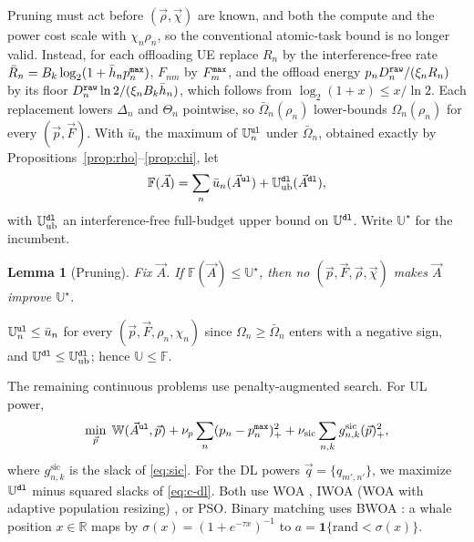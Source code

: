 \documentclass[journal]{IEEEtran}
\newtheorem{lemma}{Lemma}
\begin{document}
Pruning must act before $(\vec{\rho},\vec{\chi})$ are known, and both the compute and the power cost scale with $\chi_n\rho_n$, so the conventional atomic-task bound is no longer valid. Instead, for each offloading UE replace $R_n$ by the interference-free rate $\bar R_n=B_k\log_2(1+\bar h_np_n^{\tt max})$, $F_{nm}$ by $F_m^{\tt max}$, and the offload energy $p_nD_n^{\tt raw}/(\xi_nR_n)$ by its floor $D_n^{\tt raw}\ln2/(\xi_nB_k\bar h_n)$, which follows from $\log_2(1+x)\le x/\ln2$. Each replacement lowers $\Delta_n$ and $\Theta_n$ pointwise, so $\bar\Omega_n(\rho_n)$ lower-bounds $\Omega_n(\rho_n)$ for every $(\vec{p},\vec{F})$. With $\bar u_n$ the maximum of $\mathbb{U}_n^{\tt ul}$ under $\bar\Omega_n$, obtained exactly by Propositions~\ref{prop:rho}--\ref{prop:chi}, let
\begin{equation}
\mathbb{F}(\vec{A})=\sum_{n}\bar u_n(\vec{A}^{\tt ul})+\mathbb{U}^{\tt dl}_{\mathrm{ub}}(\vec{A}^{\tt dl}),
\label{eq:Fbound}
\end{equation}
with $\mathbb{U}^{\tt dl}_{\mathrm{ub}}$ an interference-free full-budget upper bound on $\mathbb{U}^{\tt dl}$. Write $\mathbb{U}^\star$ for the incumbent.

\begin{lemma}[Pruning]\label{lem:prune}
Fix $\vec{A}$. If $\mathbb{F}(\vec{A})\le\mathbb{U}^\star$, then no $(\vec{p},\vec{F},\vec{\rho},\vec{\chi})$ makes $\vec{A}$ improve $\mathbb{U}^\star$.
\end{lemma}
\begin{IEEEproof}
$\mathbb{U}_n^{\tt ul}\le\bar u_n$ for every $(\vec{p},\vec{F},\rho_n,\chi_n)$ since $\Omega_n\ge\bar\Omega_n$ enters with a negative sign, and $\mathbb{U}^{\tt dl}\le\mathbb{U}^{\tt dl}_{\mathrm{ub}}$; hence $\mathbb{U}\le\mathbb{F}$.
\end{IEEEproof}

The remaining continuous problems use penalty-augmented search. For UL power,
\begin{equation}
\min_{\vec{p}}\;
\mathbb{W}(\vec{A}^{\tt ul},\vec{p})
+\nu_p\sum_n(p_n-p_n^{\tt max})_+^2
+\nu_{\mathrm{sic}}\sum_{n,k}g_{n,k}^{\mathrm{sic}}(\vec{p})_+^2,
\label{eq:mpc}
\end{equation}
where $g_{n,k}^{\mathrm{sic}}$ is the slack of \eqref{eq:sic}. For the DL powers $\vec{q}=\{q_{m',n'}\}$, we maximize $\mathbb{U}^{\tt dl}$ minus squared slacks of \eqref{eq:c-dl}. Both use WOA \cite{mirjalili2016whale}, IWOA (WOA with adaptive population resizing) \cite{Hoang_TCOM_2024}, or PSO. Binary matching uses BWOA \cite{kumar2020binary}: a whale position $x\in\mathbb{R}$ maps by $\sigma(x)=(1+e^{-\tau x})^{-1}$ to $a=\mathbf{1}\{\mathrm{rand}<\sigma(x)\}$.
\end{document}
